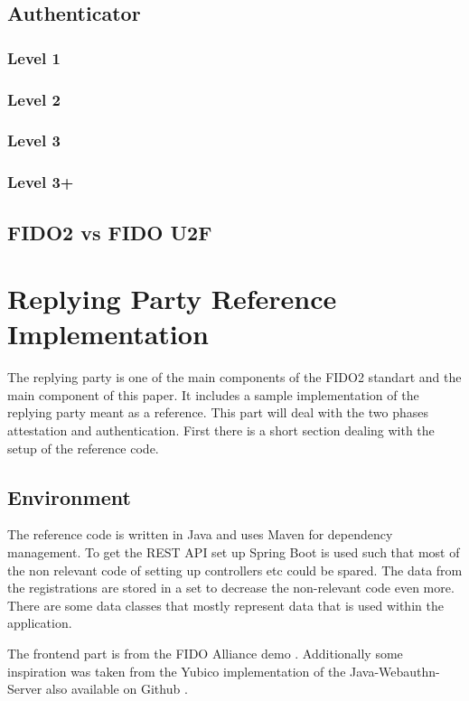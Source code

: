 \documentclass[a4paper, 11pt]{scrartcl}
\begin{document}
\subsection{Authenticator}

\subsubsection{Level 1}
\subsubsection{Level 2}
\subsubsection{Level 3}
\subsubsection{Level 3+}


\subsection{FIDO2 vs FIDO U2F}

\section{Replying Party Reference Implementation}
\label{sec:replying_party}

The replying party is one of the main components of the FIDO2 standart and the main component of this paper. It includes a sample implementation of the replying party meant as a reference. This part will deal with the two phases attestation and authentication. First there is a short section dealing with the setup of the reference code.

\subsection{Environment}

The reference code is written in Java and uses Maven for dependency management. To get the REST API set up Spring Boot is used such that most of the non relevant code of setting up controllers etc could be spared. The data from the registrations are stored in a set to decrease the non-relevant code even more. There are some data classes that mostly represent data that is used within the application. 

The frontend part is from the FIDO Alliance demo \cite{fido:demo}. Additionally some inspiration was taken from the Yubico implementation of the Java-Webauthn-Server also available on Github \cite{yubico:webauthn:server}. 
\end{document}
